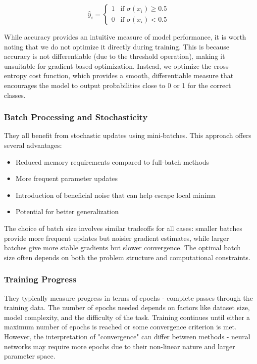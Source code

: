 \begin{equation}
    \hat{y}_i =
    \begin{cases}
        1 & \text{if } \sigma(x_i) \geq 0.5 \\
        0 & \text{if } \sigma(x_i) < 0.5
    \end{cases}
\end{equation}

While accuracy provides an intuitive measure of model performance, it is worth noting that we do not optimize it directly during training. This is because accuracy is not differentiable (due to the threshold operation), making it unsuitable for gradient-based optimization. Instead, we optimize the cross-entropy cost function, which provides a smooth, differentiable measure that encourages the model to output probabilities close to 0 or 1 for the correct classes.

\subsubsection{Batch Processing and Stochasticity}
They all benefit from stochastic updates using mini-batches. This approach offers several advantages:

\begin{itemize}
    \item Reduced memory requirements compared to full-batch methods
    \item More frequent parameter updates
    \item Introduction of beneficial noise that can help escape local minima
    \item Potential for better generalization
\end{itemize}

The choice of batch size involves similar tradeoffs for all cases: smaller batches provide more frequent updates but noisier gradient estimates, while larger batches give more stable gradients but slower convergence. The optimal batch size often depends on both the problem structure and computational constraints.

\subsubsection{Training Progress}
They typically measure progress in terms of epochs - complete passes through the training data. The number of epochs needed depends on factors like dataset size, model complexity, and the difficulty of the task. Training continues until either a maximum number of epochs is reached or some convergence criterion is met. However, the interpretation of "convergence" can differ between methods - neural networks may require more epochs due to their non-linear nature and larger parameter space.

